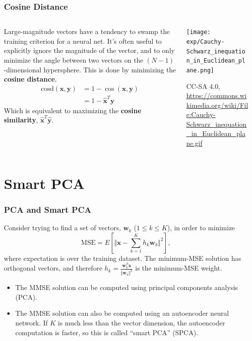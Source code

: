\documentclass{beamer}
\begin{document}
\begin{frame}
  \frametitle{Cosine Distance}
  \begin{columns}
    \begin{column}{0.5\textwidth}
      Large-magnitude vectors have a tendency to swamp the training
      criterion for a neural net.  It's often useful to explicitly
      ignore the magnitude of the vector, and to only minimize the
      angle between two vectors on the $(N-1)$-dimensional
      hypersphere.  This is done by minimizing the {\bf cosine distance},
      \begin{align*}
        \mbox{cosd}(\bm{x},\bm{y}) &=
        1-\cos(\bm{x},\bm{y})\\
        &= 1- \hat{\bm{x}}^T\hat{\bm{y}}
      \end{align*}
      Which is equivalent to maximizing the {\bf cosine similarity},
      $\hat{\bm{x}}^T\hat{\bm{y}}$.
    \end{column}
    \begin{column}{0.5\textwidth}
      \begin{center}
        \texttt{[image: exp/Cauchy-Schwarz\_inequation\_in\_Euclidean\_plane.png]}

        \begin{tiny}
          CC-SA 4.0,
          \url{https://commons.wikimedia.org/wiki/File:Cauchy-Schwarz_inequation_in_Euclidean_plane.gif}
        \end{tiny}
      \end{center}
    \end{column}
  \end{columns}
\end{frame}
        
\section{Smart PCA}
\setcounter{subsection}{1}

\begin{frame}
  \frametitle{PCA and Smart PCA}

  Consider trying to find a set of vectors, $\bm{w}_k$ ($1\le k\le
  K$), in order to minimize
  \begin{displaymath}
    \mbox{MSE}=E\left[\Vert\bm{x}-\sum_{k=1}^Kh_k \bm{w}_k\Vert^2\right],
  \end{displaymath}
  where expectation is over the training dataset.  The minimum-MSE
  solution has orthogonal vectors, and therefore
  $h_k=\frac{\bm{w}_k^T\bm{x}}{\Vert\bm{w}_k\Vert^2}$ is the
  minimum-MSE weight.
  \begin{itemize}
  \item The MMSE solution can be computed using principal components analysis (PCA).
  \item The MMSE solution can also be computed using an autoencoder neural
    network.  If $K$ is much less than the vector dimension, the
    autoencoder computation is faster, so this is called ``smart PCA''
    (SPCA).
  \end{itemize}
\end{frame}
\end{document}
